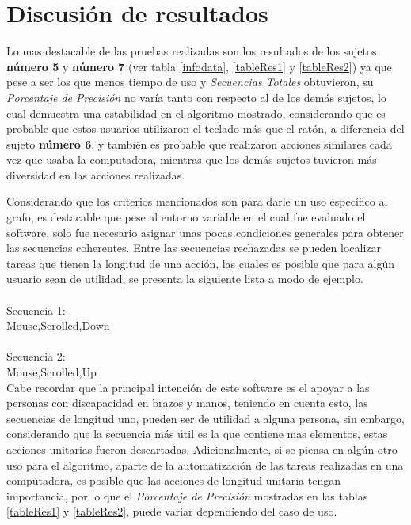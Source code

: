 \section{Discusi\'{o}n de resultados}


Lo mas destacable de las pruebas realizadas son los resultados de los sujetos 
 \textbf{n\'umero 5} y \textbf{n\'umero 7}
 (ver tabla \ref{infodata}, \ref{tableRes1} y 
 \ref{tableRes2}) ya que pese a ser los que menos tiempo de uso y
 \emph{Secuencias Totales} obtuvieron, su \emph{Porcentaje de Precisi\'on}
 no var\'ia tanto con respecto al de los dem\'as sujetos, lo cual demuestra 
 una estabilidad en el algoritmo mostrado, considerando que es probable que 
 estos usuarios utilizaron el teclado m\'as que el rat\'on, a diferencia del 
 sujeto \textbf{n\'umero 6}, y tambi\'en es probable que realizaron
 acciones similares cada vez que usaba la computadora, mientras que los 
 dem\'as sujetos tuvieron m\'as diversidad en las acciones realizadas.
 
 
Considerando que los criterios mencionados son para darle un uso espec\'ifico
 al grafo, es destacable que pese al entorno variable en el cual fue evaluado
 el software, solo fue necesario asignar unas pocas
 condiciones generales para obtener las secuencias coherentes. 
 Entre las secuencias rechazadas se pueden localizar tareas que tienen la
 longitud de una acci\'on, las cuales es posible que para alg\'un usuario 
 sean de utilidad, se presenta la siguiente lista a modo de ejemplo.
\\
\\
Secuencia 1:\\
Mouse,Scrolled,Down\\
\\
Secuencia 2:\\
Mouse,Scrolled,Up\\

Cabe recordar que la principal intenci\'on de este software es el apoyar a 
 las personas con discapacidad en brazos y manos, teniendo en cuenta esto, 
 las secuencias de longitud uno, pueden ser de utilidad a alguna persona, sin 
 embargo, considerando que la secuencia m\'as \'util es la que contiene mas 
 elementos, estas acciones unitarias fueron descartadas. Adicionalmente, si 
 se piensa en alg\'un otro uso para el algoritmo, aparte de la 
 automatizaci\'on de las tareas realizadas en una computadora, es posible que 
 las acciones de longitud unitaria tengan importancia, por lo que el
 \emph{Porcentaje de Precisi\'on} mostradas en las tablas \ref{tableRes1} y
 \ref{tableRes2}, puede variar dependiendo del caso de uso.

